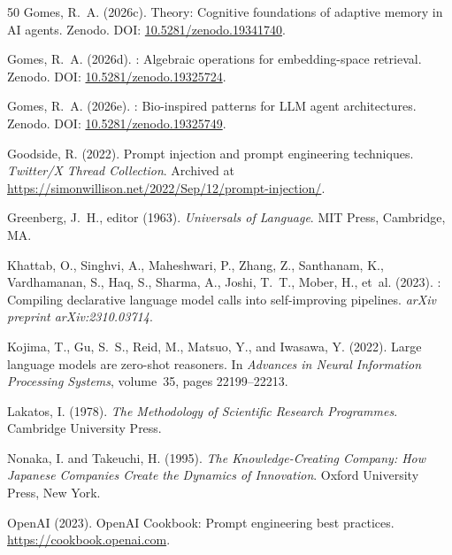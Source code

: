 \documentclass[12pt,a4paper]{article}
\begin{document}
\begin{thebibliography}{50}
Gomes, R.~A. (2026c).
 Theory: Cognitive foundations of adaptive memory in AI agents.
\newblock Zenodo. DOI: \href{https://doi.org/10.5281/zenodo.19341740}{10.5281/zenodo.19341740}.

Gomes, R.~A. (2026d).
: Algebraic operations for embedding-space retrieval.
\newblock Zenodo. DOI: \href{https://doi.org/10.5281/zenodo.19325724}{10.5281/zenodo.19325724}.

Gomes, R.~A. (2026e).
: Bio-inspired patterns for LLM agent architectures.
\newblock Zenodo. DOI: \href{https://doi.org/10.5281/zenodo.19325749}{10.5281/zenodo.19325749}.

Goodside, R. (2022).
\newblock Prompt injection and prompt engineering techniques.
\newblock \emph{Twitter/X Thread Collection}. Archived at \url{https://simonwillison.net/2022/Sep/12/prompt-injection/}.

Greenberg, J.~H., editor (1963).
\newblock \emph{Universals of Language}.
\newblock MIT Press, Cambridge, MA.

Khattab, O., Singhvi, A., Maheshwari, P., Zhang, Z., Santhanam, K., Vardhamanan, S., Haq, S., Sharma, A., Joshi, T.~T., Mober, H., et~al. (2023).
: Compiling declarative language model calls into self-improving pipelines.
\newblock \emph{arXiv preprint arXiv:2310.03714}.

Kojima, T., Gu, S.~S., Reid, M., Matsuo, Y., and Iwasawa, Y. (2022).
\newblock Large language models are zero-shot reasoners.
\newblock In \emph{Advances in Neural Information Processing Systems}, volume~35, pages 22199--22213.

Lakatos, I. (1978).
\newblock \emph{The Methodology of Scientific Research Programmes}.
\newblock Cambridge University Press.

Nonaka, I. and Takeuchi, H. (1995).
\newblock \emph{The Knowledge-Creating Company: How Japanese Companies Create the Dynamics of Innovation}.
\newblock Oxford University Press, New York.

OpenAI (2023).
\newblock OpenAI Cookbook: Prompt engineering best practices.
\newblock \url{https://cookbook.openai.com}.


\end{thebibliography}
\end{document}
